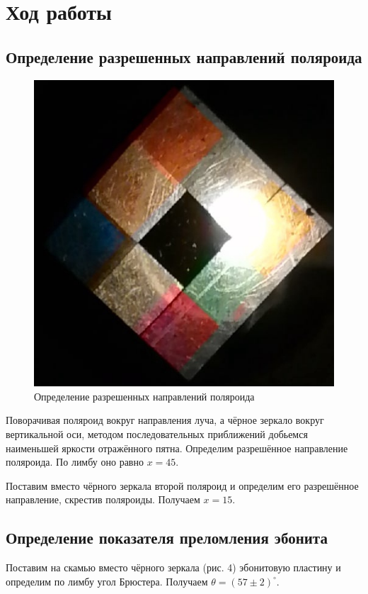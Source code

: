 \documentclass[a4paper,12pt]{article}
\begin{document}
\section{Ход работы}
\subsection{Определение разрешенных направлений поляроида}
\begin{figure}
	\includegraphics[width=\linewidth]{5}
	\caption{Определение разрешенных направлений поляроида}
	\label{ris 5}
\end{figure}
Поворачивая поляроид вокруг направления луча, а чёрное зеркало вокруг вертикальной оси, методом последовательных приближений добьемся
наименьшей яркости отражённого пятна. Определим разрешённое направление поляроида. По лимбу оно равно $ x = 45 $. \par
Поставим вместо чёрного зеркала второй поляроид и определим
его разрешённое направление, скрестив поляроиды. Получаем $ x = 15 $. 
\clearpage

\subsection{Определение показателя преломления эбонита}
Поставим на скамью вместо чёрного зеркала (рис. 4) эбонитовую
пластину и определим по лимбу угол Брюстера. Получаем $ \theta =(57 \pm 2) ^\circ$. 
\end{document}

